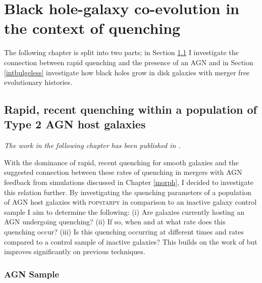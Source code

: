 
\chapter{Black hole-galaxy co-evolution in the context of quenching}\label{agnfeedback}

The following chapter is split into two parts; in Section \ref{agnfeedback} I investigate the connection between rapid quenching and the presence of an AGN and in Section \ref{intbulgeless} investigate how black holes grow in disk galaxies with merger free evolutionary histories. 

\section{Rapid, recent quenching within a population of Type 2 AGN host galaxies}\label{agnfeedback}

\emph{The work in the following chapter has been published in \citet{smethurst16}.}

With the dominance of rapid, recent quenching for smooth galaxies and the suggested connection between these rates of quenching in mergers with AGN feedback from simulations discussed in Chapter \ref{morph}, I decided to investigate this relation further. By investigating the quenching parameters of a population of AGN host galaxies with \textsc{popstarpy} in comparison to an inactive galaxy control sample I  aim to determine the following: (i) Are galaxies currently hosting an AGN undergoing quenching? (ii) If so, when and at what rate does this quenching occur? (iii) Is this quenching occurring at different times and rates compared to a control sample of inactive galaxies? This builds on the work of \citet{Martin07} but improves significantly on previous techniques.

\subsection{AGN Sample}\label{agnsample}


